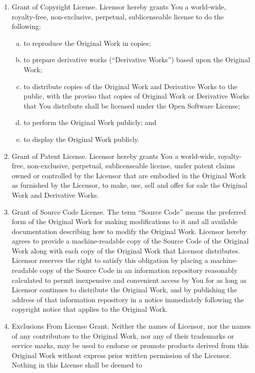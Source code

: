 \begin{small}
\begin{enumerate}[1)]
\item
Grant of Copyright License. Licensor hereby grants You a world-wide,
royalty-free, non-exclusive, perpetual, sublicenseable license to do
the following:
\begin{enumerate}[a)]
\item
to reproduce the Original Work in copies;
\item
to prepare derivative works (``Derivative Works'') based upon the
Original Work;
\item
to distribute copies of the Original Work and Derivative Works to the
public, with the proviso that copies of Original Work or Derivative
Works that You distribute shall be licensed under the Open Software
License;
\item
to perform the Original Work publicly; and
\item
to display the Original Work publicly.
\end{enumerate}
\item
Grant of Patent License. Licensor hereby grants You a world-wide,
royalty-free, non-exclusive, perpetual, sublicenseable license, under
patent claims owned or controlled by the Licensor that are embodied in
the Original Work as furnished by the Licensor, to make, use, sell and
offer for sale the Original Work and Derivative Works.
\item
Grant of Source Code License. The term ``Source Code'' means the
preferred form of the Original Work for making modifications to it and
all available documentation describing how to modify the Original
Work. Licensor hereby agrees to provide a machine-readable copy of the
Source Code of the Original Work along with each copy of the Original
Work that Licensor distributes. Licensor reserves the right to satisfy
this obligation by placing a machine-readable copy of the Source Code
in an information repository reasonably calculated to permit
inexpensive and convenient access by You for as long as Licensor
continues to distribute the Original Work, and by publishing the
address of that information repository in a notice immediately
following the copyright notice that applies to the Original Work.
\item
Exclusions From License Grant. Neither the names of Licensor, nor the
names of any contributors to the Original Work, nor any of their
trademarks or service marks, may be used to endorse or promote
products derived from this Original Work without express prior written
permission of the Licensor. Nothing in this License shall be deemed to

\end{enumerate}
\end{small}
